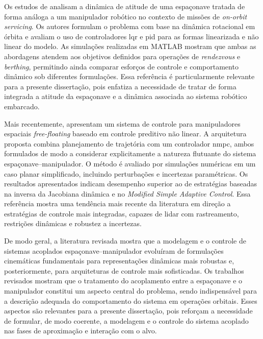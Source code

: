 Os estudos de \cite{fonseca2017attitude} analisam a dinâmica de atitude de uma espaçonave tratada de forma análoga a um manipulador robótico no contexto de missões de \textit{on-orbit servicing}. Os autores formulam o problema com base na dinâmica rotacional em órbita e avaliam o uso de controladores \gls{lqr} e \gls{pid} para as formas linearizada e não linear do modelo. As simulações realizadas em MATLAB mostram que ambas as abordagens atendem aos objetivos definidos para operações de \textit{rendezvous} e \textit{berthing}, permitindo ainda comparar esforços de controle e comportamento dinâmico sob diferentes formulações. Essa referência é particularmente relevante para a presente dissertação, pois enfatiza a necessidade de tratar de forma integrada a atitude da espaçonave e a dinâmica associada ao sistema robótico embarcado.

Mais recentemente, \cite{rybus2017nmpc} apresentam um sistema de controle para manipuladores espaciais \textit{free-floating} baseado em controle preditivo não linear. A arquitetura proposta combina planejamento de trajetória com um controlador \gls{nmpc}, ambos formulados de modo a considerar explicitamente a natureza flutuante do sistema espaçonave--manipulador. O método é avaliado por simulações numéricas em um caso planar simplificado, incluindo perturbações e incertezas paramétricas. Os resultados apresentados indicam desempenho superior ao de estratégias baseadas na inversa da Jacobiana dinâmica e no \textit{Modified Simple Adaptive Control}. Essa referência mostra uma tendência mais recente da literatura em direção a estratégias de controle mais integradas, capazes de lidar com rastreamento, restrições dinâmicas e robustez a incertezas.

De modo geral, a literatura revisada mostra que a modelagem e o controle de sistemas acoplados espaçonave--manipulador evoluíram de formulações cinemáticas fundamentais para representações dinâmicas mais robustas e, posteriormente, para arquiteturas de controle mais sofisticadas. Os trabalhos revisados mostram que o tratamento do acoplamento entre a espaçonave e o manipulador constitui um aspecto central do problema, sendo indispensável para a descrição adequada do comportamento do sistema em operações orbitais. Esses aspectos são relevantes para a presente dissertação, pois reforçam a necessidade de formular, de modo coerente, a modelagem e o controle do sistema acoplado nas fases de aproximação e interação com o alvo.